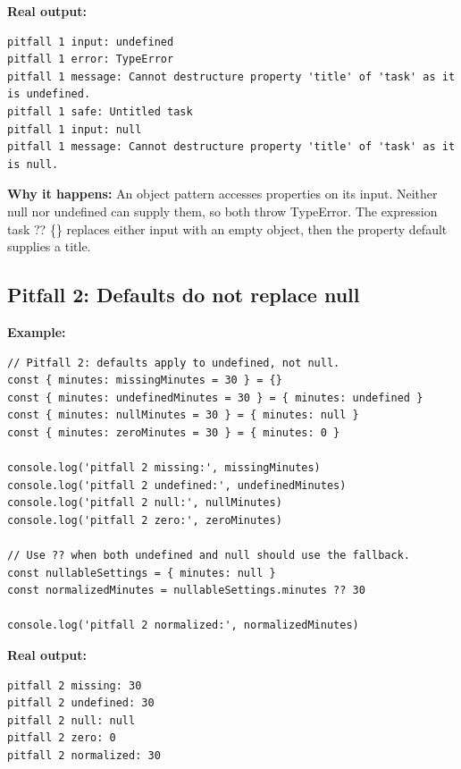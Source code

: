 \documentclass[10pt,a4paper]{article}
\begin{document}

\textbf{Real output:}

\begin{lstlisting}[language={}]
pitfall 1 input: undefined
pitfall 1 error: TypeError
pitfall 1 message: Cannot destructure property 'title' of 'task' as it is undefined.
pitfall 1 safe: Untitled task
pitfall 1 input: null
pitfall 1 message: Cannot destructure property 'title' of 'task' as it is null.
\end{lstlisting}

\textbf{Why it happens:} An object pattern accesses properties on its input. Neither null nor undefined can supply them, so both throw TypeError. The expression task ?? \{\} replaces either input with an empty object, then the property default supplies a title.

\subsection{Pitfall 2: Defaults do not replace null}


\textbf{Example:}

\begin{lstlisting}[language=GuideJS]
// Pitfall 2: defaults apply to undefined, not null.
const { minutes: missingMinutes = 30 } = {}
const { minutes: undefinedMinutes = 30 } = { minutes: undefined }
const { minutes: nullMinutes = 30 } = { minutes: null }
const { minutes: zeroMinutes = 30 } = { minutes: 0 }

console.log('pitfall 2 missing:', missingMinutes)
console.log('pitfall 2 undefined:', undefinedMinutes)
console.log('pitfall 2 null:', nullMinutes)
console.log('pitfall 2 zero:', zeroMinutes)

// Use ?? when both undefined and null should use the fallback.
const nullableSettings = { minutes: null }
const normalizedMinutes = nullableSettings.minutes ?? 30

console.log('pitfall 2 normalized:', normalizedMinutes)
\end{lstlisting}


\textbf{Real output:}

\begin{lstlisting}[language={}]
pitfall 2 missing: 30
pitfall 2 undefined: 30
pitfall 2 null: null
pitfall 2 zero: 0
pitfall 2 normalized: 30
\end{lstlisting}
\end{document}
